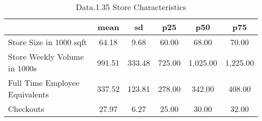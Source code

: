 \begin{table}[htbp]
\caption{\label{clabel} Data.1.35 Store Characteristics}\centering\medskip
\begin{tabular}{lccccc} \hline \hline
 & mean  & sd  & p25  & p50  & p75  \\  \hline 
Store Size in 1000 sqft &        64.18 &         9.68 &        60.00 &        68.00 &        70.00 \\  
Store Weekly Volume in 1000s &       991.51 &       333.48 &       725.00 &     1,025.00 &     1,225.00 \\  
Full Time Employee Equivalents &       337.52 &       123.81 &       278.00 &       342.00 &       408.00 \\  
Checkouts &        27.97 &         6.27 &        25.00 &        30.00 &        32.00 \\  
\hline \hline \end{tabular}
\end{table}

